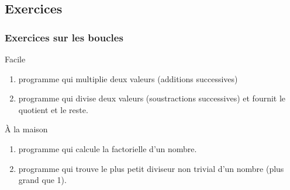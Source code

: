 \subsection{Exercices}
\begin{frame}
\frametitle{Exercices sur les boucles}
\begin{block}{Facile}
\begin{enumerate}
\item
programme qui multiplie deux valeurs (additions successives)
\item
programme qui divise deux  valeurs (soustractions successives) et fournit le quotient et le reste.
\end{enumerate}
\end{block}

\begin{block}{À la maison }
\begin{enumerate}
\item programme qui calcule la factorielle d'un nombre.
\item programme qui trouve le plus petit diviseur non 
trivial d'un nombre (plus grand que 1).
\end{enumerate}
\end{block}
\end{frame}


